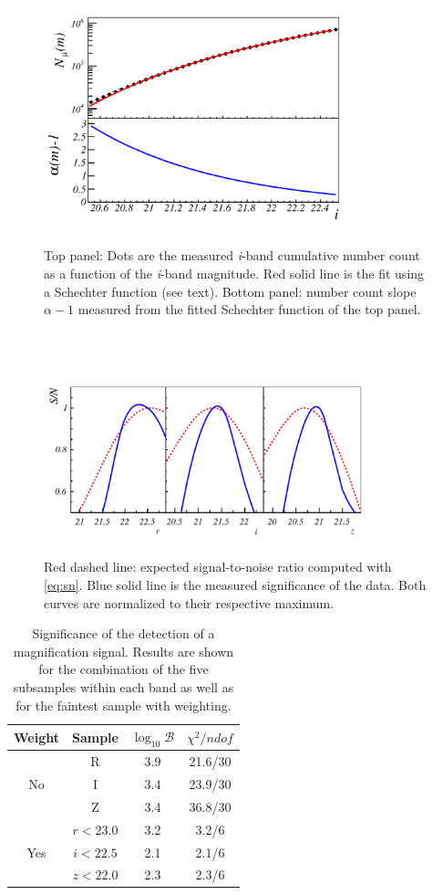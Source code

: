 \begin{figure}
\includegraphics[width=0.85\textwidth]{./figures/alphai.pdf}
\caption{Top panel: Dots are the measured {\it i}-band cumulative number count as a function of the {\it i}-band magnitude. Red solid line is the fit using a Schechter function (see text). Bottom panel: number count slope $\alpha-1$ measured from the fitted Schechter function of the top panel.}
\label{fig:alphai}
\includegraphics[width=0.85\textwidth,trim={0 1.0cm 0 2.5cm},clip]{./figures/predicted_sig.pdf}
\caption{Red dashed line: expected signal-to-noise ratio computed with \autoref{eq:sn}. Blue solid line is the measured significance of the data. Both curves are normalized to their respective maximum.}
\label{fig:significance}
\end{figure}
\begin{table}
\begin{center}\begin{tabular}{ c | c | c c }
 Weight& Sample & $\log_{10}\mathcal{B}$ & $\chi^2/ndof$  \\
\hline
 & R & 3.9 & 21.6/30\\
 No& I & 3.4 & 23.9/30\\
 & Z & 3.4 & 36.8/30\\
\hline
 & $r<23.0$ & 3.2 & 3.2/6\\
 Yes& $i < 22.5$ & 2.1&2.1/6\\
 & $z<22.0$ & 2.3&2.3/6\\
\end{tabular}\end{center}
\caption{Significance of the detection of a magnification signal. Results are shown for the combination of the five subsamples within each band as well as for the faintest sample with weighting.}
\label{tab:significance}
\end{table}
